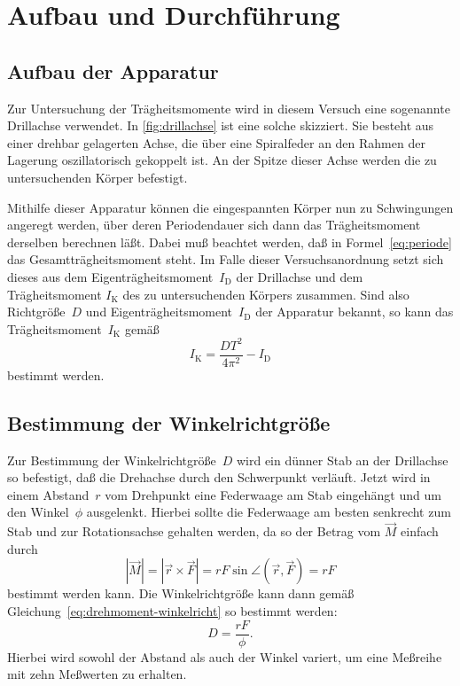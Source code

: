
\section{Aufbau und Durchführung}

\subsection{Aufbau der Apparatur}

Zur Untersuchung der Trägheitsmomente wird in diesem Versuch eine
sogenannte Drillachse verwendet.  In \cref{fig:drillachse} ist eine
solche skizziert.  Sie besteht aus einer drehbar gelagerten Achse, die
über eine Spiralfeder an den Rahmen der Lagerung oszillatorisch
gekoppelt ist.  An der Spitze dieser Achse werden die zu untersuchenden
Körper befestigt.

Mithilfe dieser Apparatur können die eingespannten Körper nun zu
Schwingungen angeregt werden, über deren Periodendauer sich dann das
Trägheitsmoment derselben berechnen läßt.  Dabei muß beachtet werden,
daß in Formel~\eqref{eq:periode} das Gesamtträgheitsmoment steht.  Im
Falle dieser Versuchsanordnung setzt sich dieses aus dem
Eigenträgheitsmoment~$I_\text{D}$ der Drillachse und dem Trägheitsmoment
$I_\text{K}$ des zu untersuchenden Körpers zusammen.  Sind also
Richtgröße~$D$ und Eigenträgheitsmoment~$I_\text{D}$ der Apparatur
bekannt, so kann das Trägheitsmoment~$I_\text{K}$ gemäß
\begin{equation}
  \label{eq:traegheit-winkelricht-drill}
  I_\text{K} = \frac{D T^2}{4 \pi^2} - I_\text{D}
\end{equation}
bestimmt werden.

\subsection{Bestimmung der Winkelrichtgröße}

Zur Bestimmung der Winkelrichtgröße~$D$ wird ein dünner Stab an der
Drillachse so befestigt, daß die Drehachse durch den Schwerpunkt
verläuft.  Jetzt wird in einem Abstand~$r$ vom Drehpunkt eine Federwaage
am Stab eingehängt und um den Winkel~$\phi$ ausgelenkt.  Hierbei sollte
die Federwaage am besten senkrecht zum Stab und zur Rotationsachse
gehalten werden, da so der Betrag vom $\vec{M}$ einfach durch
\begin{equation}
  | \vec{M} | = | \vec{r} \times \vec{F} | = r F \sin \angle(\vec{r},
  \vec{F}) = r F
\end{equation}
bestimmt werden kann.  Die Winkelrichtgröße kann dann gemäß
Gleichung~\eqref{eq:drehmoment-winkelricht} so bestimmt werden:
\begin{equation}
  \label{eq:winkelricht-kraft-abstand-winkel}
  D = \frac{r F}{\phi}.
\end{equation}
Hierbei wird sowohl der Abstand als auch der Winkel variert, um eine
Meßreihe mit zehn Meßwerten zu erhalten.

